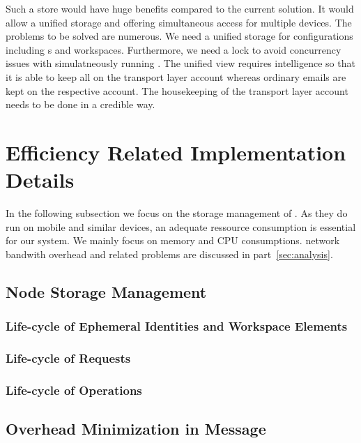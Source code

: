 Such a store would have huge benefits compared to the current solution. It would allow a unified storage and offering simultaneous access for multiple devices. The problems to be solved are numerous. We need a unified storage for configurations including s and workspaces. Furthermore, we need a lock to avoid concurrency issues with simulatneously running \VortexNodes{}. The unified view requires intelligence so that it is able to keep all \VortexMessages{} on the transport layer account  whereas ordinary emails are kept on the respective account. The housekeeping of the transport layer account needs to be done in a credible way. 

\chapter{Efficiency Related Implementation Details}
In the following subsection we focus on the storage management of \VortexNodes{}. As they do run on mobile and similar devices, an adequate ressource consumption is essential for our system. We mainly focus on memory and CPU consumptions. network bandwith overhead and related problems are discussed in part~\ref{sec:analysis}.

\section{Node Storage Management}

\subsection{Life-cycle of Ephemeral Identities and Workspace Elements}

\subsection{Life-cycle of Requests}

\subsection{Life-cycle of Operations}

\section{Overhead Minimization in Message}


